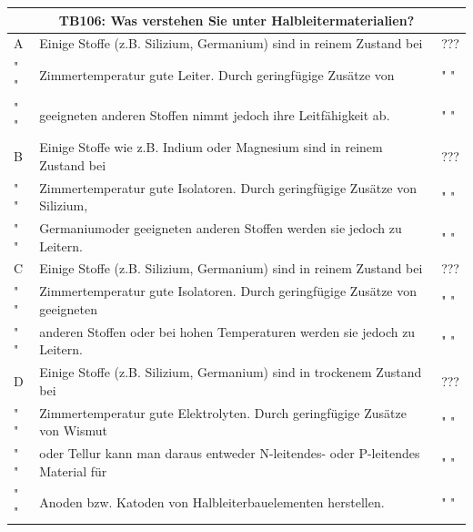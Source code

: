 \begin{frame}
	\begin{tiny}
	\begin{tabular}{|l|l|l|}
	\hline
		\multicolumn{3}{|c|}{\textbf{TB106:} Was verstehen Sie unter Halbleitermaterialien?}\\

		\hline
		A & Einige Stoffe (z.B. Silizium, Germanium) sind in reinem Zustand bei  & ??? \\
		" " & Zimmertemperatur gute Leiter. Durch geringfügige Zusätze von  & " "\\
		" " & geeigneten anderen Stoffen nimmt jedoch ihre Leitfähigkeit ab.  & " "\\ \hline
		
		B & Einige Stoffe wie z.B. Indium oder Magnesium sind in reinem Zustand bei   & ??? \\
		" " & Zimmertemperatur gute Isolatoren. Durch geringfügige Zusätze von Silizium, & " "\\
		" " & Germaniumoder geeigneten anderen Stoffen werden sie jedoch zu Leitern.  & " "\\ \hline
		C & Einige Stoffe (z.B. Silizium, Germanium) sind in reinem Zustand bei & ??? \\
		" " & Zimmertemperatur gute Isolatoren. Durch geringfügige Zusätze von geeigneten & " "\\
		" " &  anderen Stoffen oder bei hohen Temperaturen werden sie jedoch zu Leitern. & " "\\ \hline
		
		D & Einige Stoffe (z.B. Silizium, Germanium) sind in trockenem Zustand bei & ??? \\
		" " & Zimmertemperatur gute Elektrolyten. Durch geringfügige Zusätze von Wismut& " "\\
		" " & oder Tellur kann man daraus entweder N-leitendes- oder P-leitendes Material für& " "\\
		" " &   Anoden bzw. Katoden von Halbleiterbauelementen herstellen. & " " \\ \hline
	\end{tabular}
	\end{tiny}
\end{frame}

